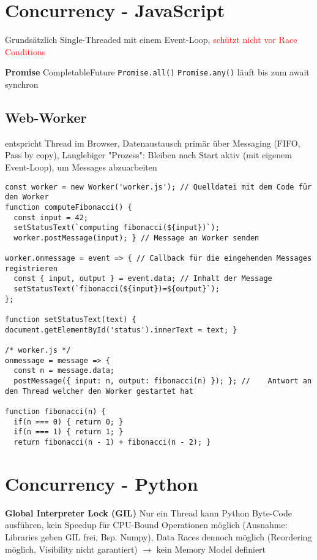 \section{Concurrency - JavaScript}
Grundsätzlich Single-Threaded mit einem Event-Loop, \textcolor{red}{schützt nicht vor Race Conditions}

\textbf{Promise} CompletableFuture \lstinline{Promise.all()} \lstinline{Promise.any()} läuft bis zum await synchron

\subsection{Web-Worker} entspricht Thread im Browser, Datenaustausch primär über Messaging (FIFO, Pass by copy), Langlebiger "Prozess": Bleiben nach Start aktiv (mit eigenem Event-Loop), um Messages abzuarbeiten

\begin{lstlisting}
const worker = new Worker('worker.js'); // Quelldatei mit dem Code für den Worker
function computeFibonacci() {
  const input = 42;
  setStatusText(`computing fibonacci(${input})`);
  worker.postMessage(input); } // Message an Worker senden

worker.onmessage = event => { // Callback für die eingehenden Messages registrieren
  const { input, output } = event.data; // Inhalt der Message
  setStatusText(`fibonacci(${input})=${output}`);
};

function setStatusText(text) { document.getElementById('status').innerText = text; }

/* worker.js */
onmessage = message => {
  const n = message.data;
  postMessage({ input: n, output: fibonacci(n) }); }; //	Antwort an den Thread welcher den Worker gestartet hat

function fibonacci(n) {
  if(n === 0) { return 0; }
  if(n === 1) { return 1; }
  return fibonacci(n - 1) + fibonacci(n - 2); }
\end{lstlisting}

\columnbreak

\section{Concurrency - Python}

\textbf{Global Interpreter Lock (GIL)} Nur ein Thread kann Python Byte-Code ausführen, kein Speedup für CPU-Bound Operationen möglich (Ausnahme: Libraries geben GIL frei, Bsp. Numpy), Data Races dennoch möglich (Reordering möglich, Visibility nicht garantiert) $\rightarrow$ kein Memory Model definiert

